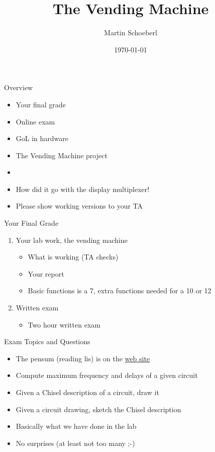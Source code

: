 

\newif\ifbook


\title{The Vending Machine}
\author{Martin Schoeberl}
\date{\today}



\begin{frame}
\titlepage
\end{frame}

\begin{frame}[fragile]{Overview}
\begin{itemize}
\item Your final grade
\item Online exam
\item GoL in hardware
\item The Vending Machine project
\item
\item How did it go with the display multiplexer!
\item Please show working versions to your TA
\end{itemize}
\end{frame}

\begin{frame}[fragile]{Your Final Grade}
\begin{enumerate}
\item Your lab work, the vending machine
\begin{itemize}
\item What is working (TA checks)
\item Your report
\item Basic functions is a 7, extra functions needed for a 10 or 12
\end{itemize}
\item Written exam
\begin{itemize}
\item Two hour written exam
\end{itemize}
\end{enumerate}
\end{frame}

\begin{frame}[fragile]{Exam Topics and Questions}
\begin{itemize}
\item The pensum (reading lis) is on the \href{http://www2.imm.dtu.dk/courses/02139/}{web site}
\item Compute maximum frequency and delays of a given circuit
\item Given a Chisel description of a circuit, draw it
\item Given a circuit drawing, sketch the Chisel description
\item Basically what we have done in the lab
\item No surprises (at least not too many ;-)
\end{itemize}
\end{frame}

